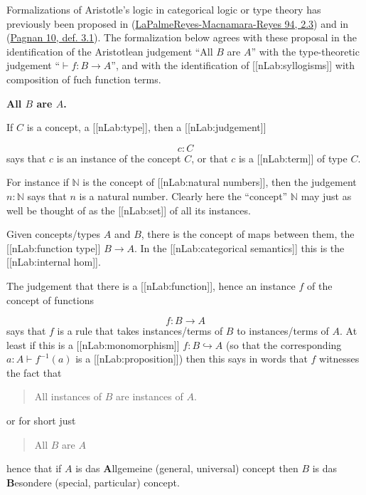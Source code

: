 \documentclass[12pt,titlepage]{article}
\theoremstyle{plain}
\theoremstyle{definition}
\theoremstyle{remark}
\begin{document}
Formalizations of Aristotle's logic in categorical logic or type theory has previously been proposed in (\hyperlink{PalmeReyesMacnamaraReyes94}{LaPalmeReyes-Macnamara-Reyes 94, 2.3}) and in (\hyperlink{Pagnan10}{Pagnan 10, def. 3.1}). The formalization below agrees with these proposal in the identification of the Aristotlean judgement ``All $B$ are $A$'' with the type-theoretic judgement ``$\vdash f \colon B\to A$'', and with the identification of [[nLab:syllogisms]] with composition of fuch function terms.

\textbf{All $B$ are $A$.}

If $C$ is a concept, a [[nLab:type]], then a [[nLab:judgement]]

\begin{displaymath}
c \colon C
\end{displaymath}
says that $c$ is an instance of the concept $C$, or that $c$ is a [[nLab:term]] of type $C$.

For instance if $\mathbb{N}$ is the concept of [[nLab:natural numbers]], then the judgement $n \colon \mathbb{N}$ says that $n$ is a natural number. Clearly here the ``concept'' $\mathbb{N}$ may just as well be thought of as the [[nLab:set]] of all its instances.

Given concepts/types $A$ and $B$, there is the concept of maps between them, the [[nLab:function type]] $B\to A$. In the [[nLab:categorical semantics]] this is the [[nLab:internal hom]].

The judgement that there is a [[nLab:function]], hence an instance $f$ of the concept of functions

\begin{displaymath}
f \colon B \longrightarrow A
\end{displaymath}
says that $f$ is a rule that takes instances/terms of $B$ to instances/terms of $A$. At least if this is a [[nLab:monomorphism]] $f \colon B \hookrightarrow A$ (so that the corresponding $a\colon A \vdash f^{-1}(a)$ is a [[nLab:proposition]]) then this says in words that $f$ witnesses the fact that

\begin{quote}%
All instances of $B$ are instances of $A$.


\end{quote}
or for short just

\begin{quote}%
All $B$ are $A$


\end{quote}
hence that if $A$ is das \textbf{A}llgemeine (general, universal) concept then $B$ is das \textbf{B}esondere (special, particular) concept.
\end{document}
